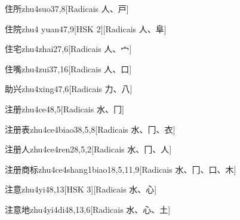 \begin{entry}{住所}{zhu4suo3}{7,8}[Radicais ⼈、⼾]
\end{entry}

\begin{entry}{住院}{zhu4 yuan4}{7,9}[HSK 2][Radicais ⼈、⾩]
\end{entry}

\begin{entry}{住宅}{zhu4zhai2}{7,6}[Radicais ⼈、⼧]
\end{entry}

\begin{entry}{住嘴}{zhu4zui3}{7,16}[Radicais ⼈、⼝]
\end{entry}

\begin{entry}{助兴}{zhu4xing4}{7,6}[Radicais ⼒、⼋]
\end{entry}

\begin{entry}{注册}{zhu4ce4}{8,5}[Radicais ⽔、⼌]
\end{entry}

\begin{entry}{注册表}{zhu4ce4biao3}{8,5,8}[Radicais ⽔、⼌、⾐]
\end{entry}

\begin{entry}{注册人}{zhu4ce4ren2}{8,5,2}[Radicais ⽔、⼌、⼈]
\end{entry}

\begin{entry}{注册商标}{zhu4ce4shang1biao1}{8,5,11,9}[Radicais ⽔、⼌、⼝、⽊]
\end{entry}

\begin{entry}{注意}{zhu4yi4}{8,13}[HSK 3][Radicais ⽔、⼼]
\end{entry}

\begin{entry}{注意地}{zhu4yi4di4}{8,13,6}[Radicais ⽔、⼼、⼟]
\end{entry}


